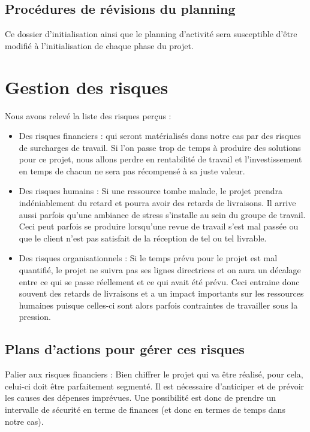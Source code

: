     \subsection{Procédures de révisions du planning}

Ce dossier d'initialisation ainsi que le planning d'activité sera susceptible d'être modifié à l'initialisation de chaque phase du projet.    

    \section{Gestion des risques}

Nous avons relevé la liste des risques perçus :

\begin{itemize}
\item Des risques financiers : qui seront matérialisés dans notre cas par des risques de surcharges de travail. Si l'on passe trop de temps à produire des solutions pour ce projet, nous allons perdre en rentabilité de travail et l'investissement en temps de chacun ne sera pas récompensé à sa juste valeur.
\item Des risques humains : Si une ressource tombe malade, le projet prendra indéniablement du retard et pourra avoir des retards de livraisons. Il arrive aussi parfois qu'une ambiance de stress s'installe au sein du groupe de travail. Ceci peut parfois se produire lorsqu'une revue de travail s'est mal passée ou que le client n'est pas satisfait de la réception de tel ou tel livrable.
\item Des risques organisationnels : Si le temps prévu pour le projet est mal quantifié, le projet ne suivra pas ses lignes directrices et on aura un décalage entre ce qui se passe réellement et ce qui avait été prévu. Ceci entraine donc souvent des retards de livraisons et a un impact importants sur les ressources humaines puisque celles-ci sont alors parfois contraintes de travailler sous la pression.
\end{itemize}

    \subsection{Plans d'actions pour gérer ces risques}

Palier aux risques financiers : Bien chiffrer le projet qui va être réalisé, pour cela, celui-ci doit être parfaitement segmenté. Il est nécessaire d'anticiper et de prévoir les causes des dépenses imprévues. Une possibilité est donc de prendre un intervalle de sécurité en terme de finances (et donc en termes de temps dans notre cas). 

